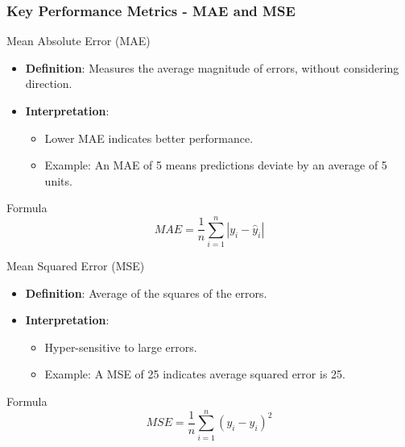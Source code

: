 \documentclass[aspectratio=169]{beamer}
\begin{document}
\begin{frame}[fragile]
    \frametitle{Key Performance Metrics - MAE and MSE}
    \begin{block}{Mean Absolute Error (MAE)}
        \begin{itemize}
            \item \textbf{Definition}: Measures the average magnitude of errors, without considering direction.
            \item \textbf{Interpretation}:
            \begin{itemize}
                \item Lower MAE indicates better performance.
                \item Example: An MAE of 5 means predictions deviate by an average of 5 units.
            \end{itemize}
        \end{itemize}
        \begin{block}{Formula}
            \begin{equation}
                MAE = \frac{1}{n} \sum_{i=1}^{n} |y_i - \hat{y}_i|
            \end{equation}
        \end{block}
    \end{block}
    
    \begin{block}{Mean Squared Error (MSE)}
        \begin{itemize}
            \item \textbf{Definition}: Average of the squares of the errors.
            \item \textbf{Interpretation}:
            \begin{itemize}
                \item Hyper-sensitive to large errors.
                \item Example: A MSE of 25 indicates average squared error is 25.
            \end{itemize}
        \end{itemize}
        \begin{block}{Formula}
            \begin{equation}
                MSE = \frac{1}{n} \sum_{i=1}^{n} (y_i - \hat{y}_i)^2
            \end{equation}
        \end{block}
    \end{block}
\end{frame}
\end{document}
